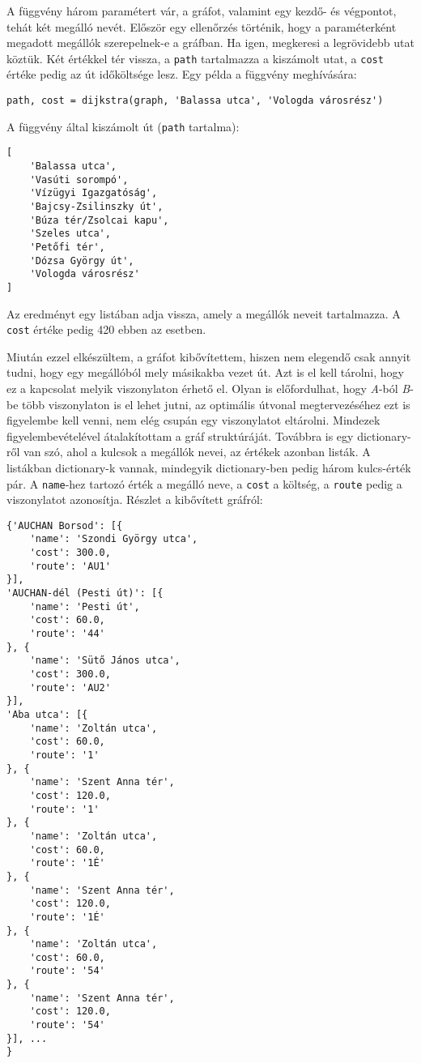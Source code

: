 A függvény három paramétert vár, a gráfot, valamint egy kezdő- és végpontot, tehát két megálló nevét. Először egy ellenőrzés történik, hogy a paraméterként megadott megállók szerepelnek-e a gráfban. Ha igen, megkeresi a legrövidebb utat köztük. Két értékkel tér vissza, a \texttt{path} tartalmazza a kiszámolt utat, a \texttt{cost} értéke pedig az út időköltsége lesz.
Egy példa a függvény meghívására:

\begin{verbatim}
path, cost = dijkstra(graph, 'Balassa utca', 'Vologda városrész')
\end{verbatim}

A függvény által kiszámolt út (\texttt{path} tartalma):

\begin{verbatim}
[
    'Balassa utca',
    'Vasúti sorompó',
    'Vízügyi Igazgatóság',
    'Bajcsy-Zsilinszky út',
    'Búza tér/Zsolcai kapu',
    'Szeles utca',
    'Petőfi tér',
    'Dózsa György út',
    'Vologda városrész'
]
\end{verbatim}

Az eredményt egy listában adja vissza, amely a megállók neveit tartalmazza. A \texttt{cost} értéke pedig 420 ebben az esetben.

Miután ezzel elkészültem, a gráfot kibővítettem, hiszen nem elegendő csak annyit tudni, hogy egy megállóból mely másikakba vezet út. Azt is el kell tárolni, hogy ez a kapcsolat melyik viszonylaton érhető el. Olyan is előfordulhat, hogy \textit{A}-ból \textit{B}-be több viszonylaton is el lehet jutni, az optimális útvonal megtervezéséhez ezt is figyelembe kell venni, nem elég csupán egy viszonylatot eltárolni.
Mindezek figyelembevételével átalakítottam a gráf struktúráját. Továbbra is egy dictionary-ről van szó, ahol a kulcsok a megállók nevei, az értékek azonban listák. A listákban dictionary-k vannak, mindegyik dictionary-ben pedig három kulcs-érték pár. A \texttt{name}-hez tartozó érték a megálló neve, a \texttt{cost} a költség, a \texttt{route} pedig a viszonylatot azonosítja.
Részlet a kibővített gráfról:

\begin{verbatim}
{'AUCHAN Borsod': [{
    'name': 'Szondi György utca',
    'cost': 300.0,
    'route': 'AU1'
}],
'AUCHAN-dél (Pesti út)': [{
    'name': 'Pesti út',
    'cost': 60.0,
    'route': '44'
}, {
    'name': 'Sütő János utca',
    'cost': 300.0,
    'route': 'AU2'
}],
'Aba utca': [{
    'name': 'Zoltán utca',
    'cost': 60.0,
    'route': '1'
}, {
    'name': 'Szent Anna tér',
    'cost': 120.0,
    'route': '1'
}, {
    'name': 'Zoltán utca',
    'cost': 60.0,
    'route': '1É'
}, {
    'name': 'Szent Anna tér',
    'cost': 120.0,
    'route': '1É'
}, {
    'name': 'Zoltán utca',
    'cost': 60.0,
    'route': '54'
}, {
    'name': 'Szent Anna tér',
    'cost': 120.0,
    'route': '54'
}], ...
}
\end{verbatim}

